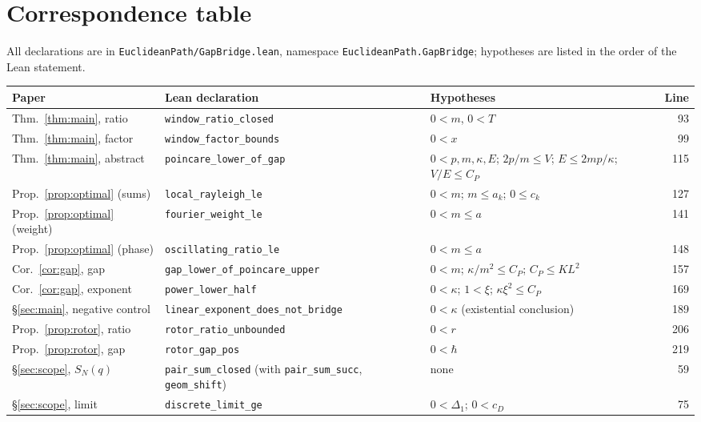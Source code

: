\documentclass[11pt,a4paper]{article}
\theoremstyle{definition}
\theoremstyle{remark}
\newcommand{\code}[1]{\texttt{#1}}
\begin{document}
\section{Correspondence table}\label{sec:corr}

{\sloppy All declarations are in \code{EuclideanPath/\allowbreak{}GapBridge.lean}, namespace \code{EuclideanPath.\allowbreak{}GapBridge}; hypotheses are listed in the order of the Lean statement.\par}

\begin{center}\small
\begin{longtable}{@{}p{}p{}p{}r@{}}
\toprule
Paper & Lean declaration & Hypotheses & Line\\ \midrule
\endhead
Thm.~\ref{thm:main}, ratio & \code{window\_ratio\_closed} & $0<m$, $0<T$ & 93\\
Thm.~\ref{thm:main}, factor & \code{window\_factor\_bounds} & $0<x$ & 99\\
Thm.~\ref{thm:main}, abstract & \code{poincare\_lower\_of\_gap} & $0<p,m,\kappa,E$; $2p/m\le V$; $E\le2mp/\kappa$; $V/E\le C_P$ & 115\\
Prop.~\ref{prop:optimal} (sums) & \code{local\_rayleigh\_le} & $0<m$; $m\le a_k$; $0\le c_k$ & 127\\
Prop.~\ref{prop:optimal} (weight) & \code{fourier\_weight\_le} & $0<m\le a$ & 141\\
Prop.~\ref{prop:optimal} (phase) & \code{oscillating\_ratio\_le} & $0<m\le a$ & 148\\
Cor.~\ref{cor:gap}, gap & \code{gap\_lower\_of\_poincare\_upper} & $0<m$; $\kappa/m^2\le C_P$; $C_P\le KL^2$ & 157\\
Cor.~\ref{cor:gap}, exponent & \code{power\_lower\_half} & $0<\kappa$; $1<\xi$; $\kappa\xi^2\le C_P$ & 169\\
\S\ref{sec:main}, negative control & \code{linear\_exponent\_\allowbreak{}does\_not\_bridge} & $0<\kappa$ (existential conclusion) & 189\\
Prop.~\ref{prop:rotor}, ratio & \code{rotor\_ratio\_unbounded} & $0<r$ & 206\\
Prop.~\ref{prop:rotor}, gap & \code{rotor\_gap\_pos} & $0<\hbar$ & 219\\
\S\ref{sec:scope}, $S_N(q)$ & \code{pair\_sum\_closed} (with \code{pair\_sum\_succ}, \code{geom\_shift}) & none & 59\\
\S\ref{sec:scope}, limit & \code{discrete\_limit\_ge} & $0<\Delta_1$; $0<c_D$ & 75\\
\bottomrule
\end{longtable}
\end{center}
\end{document}
